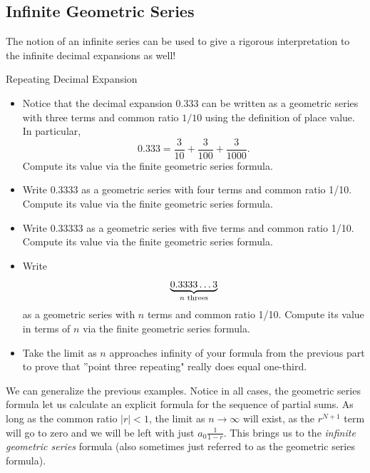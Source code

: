 \subsection{Infinite Geometric Series}\label{Geometrickery}
The notion of an infinite series can be used to give a rigorous interpretation to the infinite decimal expansions as well! 

\begin{exercise}{Repeating Decimal Expansion \Coffeecup \Coffeecup }\label{ThreeBar}

\begin{itemize}
\item Notice that the decimal expansion 0.333 can be written as a geometric series with three terms and common ratio $1/10$ using the definition of place value.  In particular, $$ 0.333=\frac{3}{10}+\frac{3}{100}+\frac{3}{1000}.$$ Compute its value via the finite geometric series formula.

\vspace*{1in}

\item Write 0.3333 as a geometric series with four terms and common ratio 1/10.  Compute its value via the finite geometric series formula.

\vspace*{1in}

\item Write 0.33333 as a geometric series with five terms and common ratio 1/10.  Compute its value via the finite geometric series formula.

\vspace*{1in}

\item Write $$ \underbrace{0.3333 \ldots 3}_{n \textup{ threes}} $$ as a geometric series with $n$ terms and common ratio 1/10.  Compute its value in terms of $n$ via the finite geometric series formula.

\vspace*{1in}

\item Take the limit as $n$ approaches infinity of your formula from the previous part to prove that ''point three repeating" really does equal one-third.

\vspace*{1in}
\end{itemize}
\end{exercise}

We can generalize the previous examples.  Notice in all cases, the geometric series formula let us calculate an explicit formula for the sequence of partial sums.  As long as the common ratio $|r|<1$, the limit as $n\rightarrow \infty$ will exist, as the $r^{N+1}$ term will go to zero and we will be left with just $a_0\frac{1}{1-r}$.  This brings us to the \emph{infinite geometric series} formula (also sometimes just referred to as the geometric series formula).

